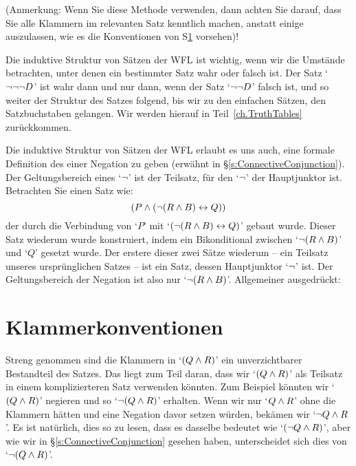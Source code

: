 (Anmerkung: Wenn Sie diese Methode verwenden, dann achten Sie darauf, dass Sie alle Klammern im relevanten Satz kenntlich machen, anstatt einige auszulassen, wie es die Konventionen von S\ref{TFLconventions} vorsehen)!


Die induktive Struktur von Sätzen der WFL ist wichtig, wenn wir die Umstände betrachten, unter denen ein bestimmter Satz wahr oder falsch ist. Der Satz `$\neg \neg \neg D$' ist wahr dann und nur dann, wenn der Satz `$\neg \neg D$' falsch ist, und so weiter der Struktur des Satzes folgend, bis wir zu den einfachen Sätzen, den Satzbuchstaben gelangen. Wir werden hierauf in Teil~\ref{ch.TruthTables} zurückkommen.

Die induktive Struktur von Sätzen der WFL erlaubt es uns auch, eine formale Definition des  einer Negation zu geben (erwähnt in \S\ref{s:ConnectiveConjunction}). Der Geltungsbereich eines `$\neg$' ist der Teilsatz, für den `$\neg$' der Hauptjunktor ist. Betrachten Sie einen Satz wie:
$$(P \wedge (\neg (R \wedge B) \leftrightarrow Q))$$
der durch die Verbindung von `$P$' mit `$ (\neg (R \wedge B) \leftrightarrow Q)$' gebaut wurde. Dieser Satz wiederum wurde konstruiert, indem ein Bikonditional zwischen `$\neg (R \wedge B)$' und `$Q$' gesetzt wurde. Der erstere dieser zwei Sätze wiederum -- ein Teilsatz unseres ursprünglichen Satzes -- ist ein Satz, dessen Hauptjunktor `$\neg$' ist. Der Geltungsbereich der Negation ist also nur `$\neg(R \wedge B)$'. Allgemeiner ausgedrückt:


\section{Klammerkonventionen}
\label{TFLconventions}
Streng genommen sind die Klammern in `$(Q \wedge R)$' ein unverzichtbarer Bestandteil des Satzes. Das liegt zum Teil daran, dass wir `$(Q \wedge R)$' als Teilsatz in einem komplizierteren Satz verwenden könnten. Zum Beispiel könnten wir `$(Q \wedge R)$' negieren und so `$\neg(Q \wedge R)$' erhalten. Wenn wir nur `$Q \wedge R$' ohne die Klammern hätten und eine Negation davor setzen würden, bekämen wir `$\neg Q \wedge R$'. Es ist natürlich, dies so zu lesen, dass es dasselbe bedeutet wie `$(\neg Q \wedge R)$', aber wie wir in \S\ref{s:ConnectiveConjunction} gesehen haben, unterscheidet sich dies von `$\neg(Q\wedge R)$'.

